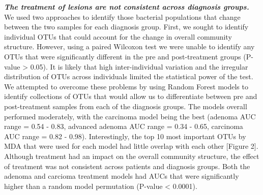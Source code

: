 \documentclass[12pt,]{article}
\begin{document}
\textbf{\emph{The treatment of lesions are not consistent across
diagnosis groups.}} We used two approaches to identify those bacterial
populations that change between the two samples for each diagnosis
group. First, we sought to identify individual OTUs that could account
for the change in overall community structure. However, using a paired
Wilcoxon test we were unable to identify any OTUs that were
significantly different in the pre and post-treatment groups (P-value
\textgreater{} 0.05). It is likely that high inter-individual variation
and the irregular distribution of OTUs across individuals limited the
statistical power of the test. We attempted to overcome these problems
by using Random Forest models to identify collections of OTUs that would
allow us to differentiate between pre and post-treatment samples from
each of the diagnosis groups. The models overall performed moderately,
with the carcinoma model being the best (adenoma AUC range = 0.54 -
0.83, advanced adenoma AUC range = 0.34 - 0.65, carcinoma AUC range =
0.82 - 0.98). Interestingly, the top 10 most important OTUs by MDA that
were used for each model had little overlap with each other {[}Figure
2{]}. Although treatment had an impact on the overall community
structure, the effect of treatment was not consistent across patients
and diagnosis groups. Both the adenoma and carcioma treatment models had
AUCs that were significantly higher than a random model permutation
(P-value \textless{} 0.0001).
\end{document}
